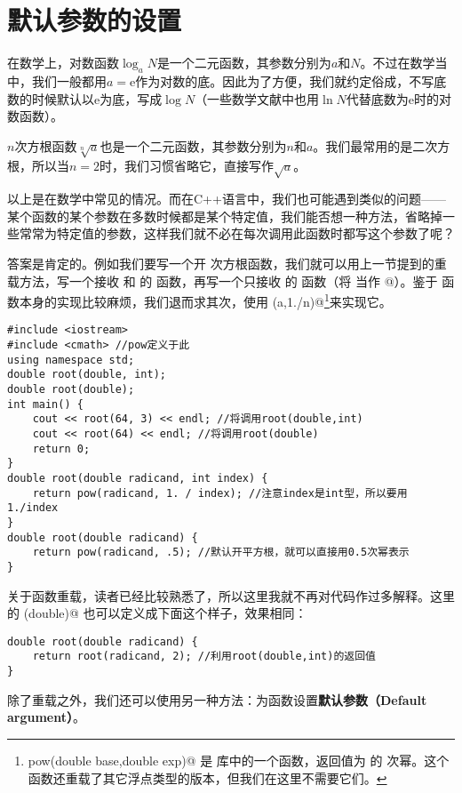 \section{默认参数的设置}
在数学上，对数函数$\log_aN$是一个二元函数，其参数分别为$a$和$N$。不过在数学当中，我们一般都用$a=\mathrm{e}$作为对数的底。因此为了方便，我们就约定俗成，不写底数的时候默认以$\mathrm{e}$为底，写成$\log{N}$（一些数学文献中也用$\ln{N}$代替底数为$\mathrm{e}$时的对数函数）。\par
$n$次方根函数$\sqrt[n]{a}$也是一个二元函数，其参数分别为$n$和$a$。我们最常用的是二次方根，所以当$n=2$时，我们习惯省略它，直接写作$\sqrt{a}$。\par
以上是在数学中常见的情况。而在C++语言中，我们也可能遇到类似的问题——某个函数的某个参数在多数时候都是某个特定值，我们能否想一种方法，省略掉一些常常为特定值的参数，这样我们就不必在每次调用此函数时都写这个参数了呢？\par
答案是肯定的。例如我们要写一个开 \lstinline@n@ 次方根函数，我们就可以用上一节提到的重载方法，写一个接收 \lstinline@a@ 和 \lstinline@n@ 的 \lstinline@root@ 函数，再写一个只接收 \lstinline@a@ 的 \lstinline@root@ 函数（将 \lstinline@n@ 当作 @）。鉴于 \lstinline@root@ 函数本身的实现比较麻烦，我们退而求其次，使用 \lstinline@pow(a,1./n)@\footnote{\lstinline@double pow(double base,double exp)@ 是 \lstinline@cmath@ 库中的一个函数，返回值为 \lstinline@base@ 的 \lstinline@exp@ 次幂。这个函数还重载了其它浮点类型的版本，但我们在这里不需要它们。}来实现它。\par
\begin{lstlisting}
#include <iostream>
#include <cmath> //pow定义于此
using namespace std;
double root(double, int);
double root(double);
int main() {
    cout << root(64, 3) << endl; //将调用root(double,int)
    cout << root(64) << endl; //将调用root(double)
    return 0;
}
double root(double radicand, int index) {
    return pow(radicand, 1. / index); //注意index是int型，所以要用1./index
}
double root(double radicand) {
    return pow(radicand, .5); //默认开平方根，就可以直接用0.5次幂表示
}
\end{lstlisting}
关于函数重载，读者已经比较熟悉了，所以这里我就不再对代码作过多解释。这里的 \lstinline@root(double)@ 也可以定义成下面这个样子，效果相同：
\begin{lstlisting}
double root(double radicand) {
    return root(radicand, 2); //利用root(double,int)的返回值
}
\end{lstlisting}\par
除了重载之外，我们还可以使用另一种方法：为函数设置\textbf{默认参数（Default argument）}。\par
